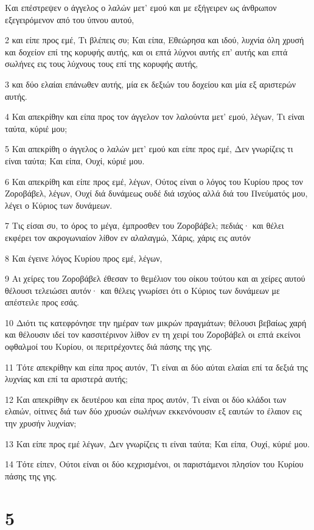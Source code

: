 \par Και επέστρεψεν ο άγγελος ο λαλών μετ' εμού και με εξήγειρεν ως άνθρωπον εξεγειρόμενον από του ύπνου αυτού,
\par 2 και είπε προς εμέ, Τι βλέπεις συ; Και είπα, Εθεώρησα και ιδού, λυχνία όλη χρυσή και δοχείον επί της κορυφής αυτής, και οι επτά λύχνοι αυτής επ' αυτής και επτά σωλήνες εις τους λύχνους τους επί της κορυφής αυτής,
\par 3 και δύο ελαίαι επάνωθεν αυτής, μία εκ δεξιών του δοχείου και μία εξ αριστερών αυτής.
\par 4 Και απεκρίθην και είπα προς τον άγγελον τον λαλούντα μετ' εμού, λέγων, Τι είναι ταύτα, κύριέ μου;
\par 5 Και απεκρίθη ο άγγελος ο λαλών μετ' εμού και είπε προς εμέ, Δεν γνωρίζεις τι είναι ταύτα; Και είπα, Ουχί, κύριέ μου.
\par 6 Και απεκρίθη και είπε προς εμέ, λέγων, Ούτος είναι ο λόγος του Κυρίου προς τον Ζοροβάβελ, λέγων, Ουχί διά δυνάμεως ουδέ διά ισχύος αλλά διά του Πνεύματός μου, λέγει ο Κύριος των δυνάμεων.
\par 7 Τις είσαι συ, το όρος το μέγα, έμπροσθεν του Ζοροβάβελ; πεδιάς· και θέλει εκφέρει τον ακρογωνιαίον λίθον εν αλαλαγμώ, Χάρις, χάρις εις αυτόν
\par 8 Και έγεινε λόγος Κυρίου προς εμέ, λέγων,
\par 9 Αι χείρες του Ζοροβάβελ έθεσαν το θεμέλιον του οίκου τούτου και αι χείρες αυτού θέλουσι τελειώσει αυτόν· και θέλεις γνωρίσει ότι ο Κύριος των δυνάμεων με απέστειλε προς εσάς.
\par 10 Διότι τις κατεφρόνησε την ημέραν των μικρών πραγμάτων; θέλουσι βεβαίως χαρή και θέλουσιν ιδεί τον κασσιτέρινον λίθον εν τη χειρί του Ζοροβάβελ οι επτά εκείνοι οφθαλμοί του Κυρίου, οι περιτρέχοντες διά πάσης της γης.
\par 11 Τότε απεκρίθην και είπα προς αυτόν, Τι είναι αι δύο αύται ελαίαι επί τα δεξιά της λυχνίας και επί τα αριστερά αυτής;
\par 12 Και απεκρίθην εκ δευτέρου και είπα προς αυτόν, Τι είναι οι δύο κλάδοι των ελαιών, οίτινες διά των δύο χρυσών σωλήνων εκκενόνουσιν εξ εαυτών το έλαιον εις την χρυσήν λυχνίαν;
\par 13 Και είπε προς εμέ λέγων, Δεν γνωρίζεις τι είναι ταύτα; Και είπα, Ουχί, κύριέ μου.
\par 14 Τότε είπεν, Ούτοι είναι οι δύο κεχρισμένοι, οι παριστάμενοι πλησίον του Κυρίου πάσης της γης.

\chapter{5}

